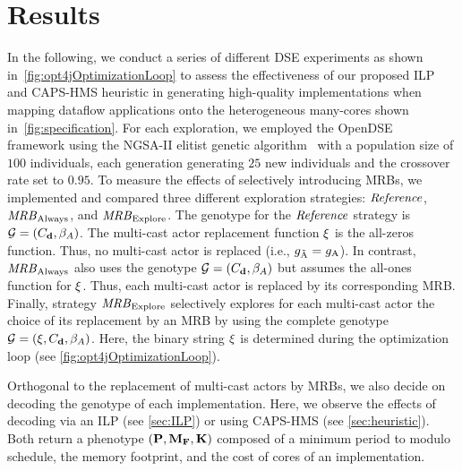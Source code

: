 \vspace{-1mm}
\section{Results}\label{sec:results}

In the following, we conduct a series of different \ac{DSE} experiments as shown in~\cref{fig:opt4jOptimizationLoop} to assess the effectiveness of our proposed \ac{ILP} and \ac{CAPS-HMS} heuristic in generating high-quality implementations when mapping dataflow applications onto the heterogeneous many-cores shown in~\cref{fig:specification}.
For each exploration, we employed the OpenDSE~\cite{opendse} framework using the NGSA-II elitist genetic algorithm~\cite{dpam_2002-nsgaII} with a population size of $100$ individuals, each generation generating $25$ new individuals and the crossover rate set to $0.95$.
To measure the effects of selectively introducing \acp{MRB}, we implemented and compared three different exploration strategies: ${\it Reference}$, ${\it MRB}_{\mathrm{Always}}$, and ${\it MRB}_{\mathrm{Explore}}$.
The genotype for the ${\it Reference}$ strategy is $\mathcal{G} = (C_\mathtt{\mathbf{d}}, \beta_A)$.
The multi-cast actor replacement function $\xi$ is the all-zeros function.
Thus, no multi-cast actor is replaced (i.e., $g_{\tilde{\textrm{A}}}=g_\textrm{A}$).
In contrast, ${\it MRB}_{\mathrm{Always}}$ also uses the genotype $\mathcal{G} = (C_\mathtt{\mathbf{d}}, \beta_A)$ but assumes the all-ones function for $\xi$.
Thus, each multi-cast actor is replaced by its corresponding \ac{MRB}.
Finally, strategy ${\it MRB}_{\mathrm{Explore}}$ selectively explores for each multi-cast actor the choice of its replacement by an \ac{MRB} by using the complete genotype $\mathcal{G} = (\xi, C_\mathtt{\mathbf{d}}, \beta_A)$.
Here, the binary string $\xi$ is determined during the optimization loop (see \cref{fig:opt4jOptimizationLoop}).
\par
Orthogonal to the replacement of multi-cast actors by \acp{MRB}, we also decide on decoding the genotype of each implementation.
Here, we observe the effects of decoding via an ILP (see \cref{sec:ILP}) or using \ac{CAPS-HMS} (see \cref{sec:heuristic}).
Both return a phenotype $(\mathbf{P},\mathbf{M_F}, \mathbf{K})$ composed of a minimum period to modulo schedule, the memory footprint, and the cost of cores of an implementation.
